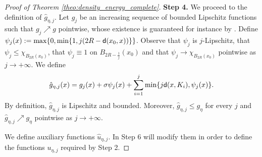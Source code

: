 \documentclass[12pt]{amsart}
\newcommand{\sfd}{{\sf d}}
\newcommand{\mm}{\mathfrak m}
\theoremstyle{definition}
\begin{document}
\begin{proof}[Proof of Theorem \ref{theo:density_energy_complete}]
    {\bf Step 4.} We proceed to the definition of $\hat{g}_{\eta,j}$. Let $g_{j}$ be an increasing sequence of bounded Lipschitz functions such that $g_j \nearrow g$ pointwise, whose existence is guaranteed for instance by \cite[Corollary 4.2.3]{HKST15}. Define $\psi_{j}(x) := \max\{0,\min\{1, j(2R - \sfd(x_0, x))\}\}$. Observe that $\psi_{j}$ is $j$-Lipschitz, that $\psi_{j} \le \chi_{B_{2R}(x_0)}$, that $\psi_{j} \equiv 1$ on $B_{2R - \frac{1}{j}}(x_0)$ and that $\psi_{j} \to \chi_{B_{2R}(x_0)}$ pointwise as $j\to +\infty$.    
    We define
    \begin{equation}
            \hat{g}_{\eta,j}(x) = g_j(x) + \sigma\psi_j(x) + \sum_{i=1}^j \min\{j\sfd(x,K_i), \psi_j(x)\}.
        \end{equation}
    By definition, $\hat{g}_{\eta,j}$ is Lipschitz and bounded. Moreover, $\hat{g}_{\eta,j} \le g_\eta$ for every $j$ and $\hat{g}_{\eta,j} \nearrow g_\eta$ pointwise as $j \to +\infty$. 
    \vspace{2mm}

    We define auxiliary functions $\hat{u}_{\eta,j}$. In Step 6 will modify them in order to define the functions $u_{\eta,j}$ required by Step 2.


\end{proof}
\end{document}
